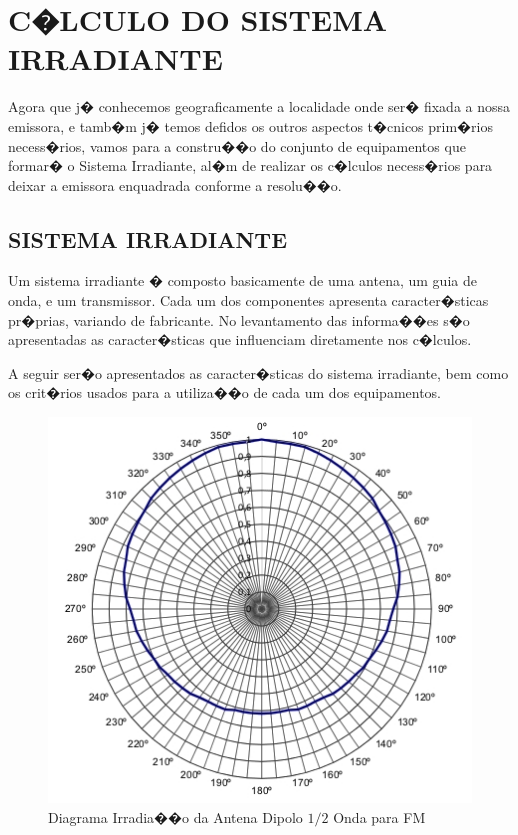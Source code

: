 \chapter{C�LCULO DO SISTEMA IRRADIANTE}

Agora que j� conhecemos geograficamente a localidade onde ser� fixada a nossa emissora, e tamb�m j� temos defidos os outros aspectos t�cnicos prim�rios
 necess�rios, vamos para a constru��o do conjunto de equipamentos que formar� o Sistema Irradiante, al�m de realizar os c�lculos necess�rios para
deixar a emissora enquadrada conforme a resolu��o.


\section{SISTEMA IRRADIANTE}

Um sistema irradiante � composto basicamente de uma antena, um guia de onda, e um transmissor. Cada um dos componentes apresenta caracter�sticas pr�prias, 
variando de fabricante. No levantamento das informa��es s�o apresentadas as caracter�sticas que influenciam diretamente nos c�lculos.

A seguir ser�o apresentados as caracter�sticas do sistema irradiante, bem como os crit�rios usados para a utiliza��o de cada um dos equipamentos.


\begin{figure}[!htb]
\centering
\large
\includegraphics[scale=1]{./figuras/diagrama_de_irradiacao.jpg} 
\caption{Diagrama Irradia��o da Antena Dipolo $1/2$ Onda para FM}
\label{diagramaDeIrradiacao}
\end{figure}


